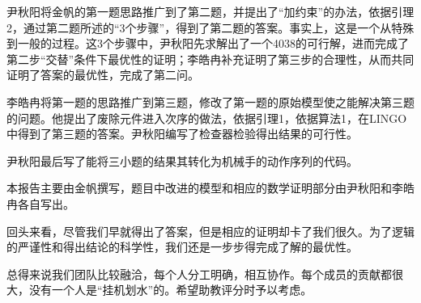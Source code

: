 \documentclass{ctexart}
\begin{document}
{{        尹秋阳将金帆的第一题思路推广到了第二题，并提出了“加约束”的办法，依据引理2，通过第二题所述的“3个步骤”，得到了第二题的答案。事实上，这是一个从特殊到一般的过程。这3个步骤中，尹秋阳先求解出了一个4038的可行解，进而完成了第二步“交替”条件下最优性的证明；李皓冉补充证明了第三步的合理性，从而共同证明了答案的最优性，完成了第二问。

        李皓冉将第一题的思路推广到第三题，修改了第一题的原始模型使之能解决第三题的问题。他提出了废除元件进入次序的做法，依据引理1，依据算法1，在LINGO中得到了第三题的答案。尹秋阳编写了检查器检验得出结果的可行性。

        尹秋阳最后写了能将三小题的结果其转化为机械手的动作序列的代码。
        
        本报告主要由金帆撰写，题目中改进的模型和相应的数学证明部分由尹秋阳和李皓冉各自写出。
        
        回头来看，尽管我们早就得出了答案，但是相应的证明却卡了我们很久。为了逻辑的严谨性和得出结论的科学性，我们还是一步步得完成了解的最优性。
        
        总得来说我们团队比较融洽，每个人分工明确，相互协作。每个成员的贡献都很大，没有一个人是“挂机划水”的。希望助教评分时予以考虑。

    }
}

\clearpage
\end{document}
